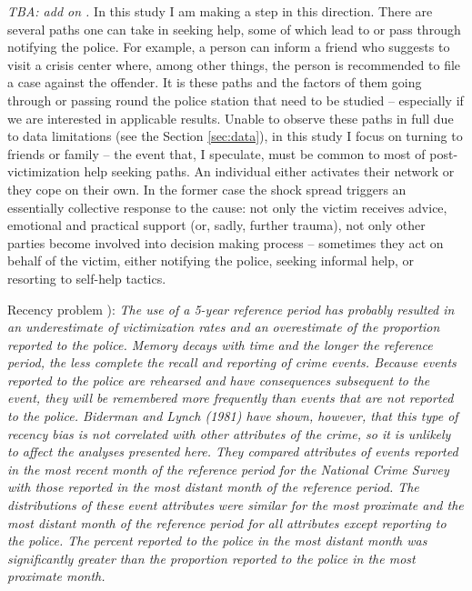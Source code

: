 \documentclass[]{article}
\begin{document}
 	
 \textit{TBA: add on \cite{pescosolido1998social}.} In this study I am making a step in this direction. There are several paths one can take in seeking help, some of which lead to or pass through notifying the police. For example, a person can inform a friend who suggests to visit a crisis center where, among other things, the person is recommended to file a case against the offender. It is these paths and the factors of them going through or passing round the police station that need to be studied -- especially if we are interested in applicable results. Unable to observe these paths in full due to data limitations (see the Section \ref{sec:data}), in this study I focus on turning to friends or family -- the event that, I speculate, must be common to most of post-victimization help seeking paths. An individual either activates their network or they cope on their own. In the former case the shock spread triggers an essentially collective response to the cause: not only the victim receives advice, emotional and practical support (or, sadly, further trauma), not only other parties become involved into decision making process -- sometimes they act on behalf of the victim, either notifying the police, seeking informal help, or resorting to self-help tactics.

		Recency problem \citep{goudriaan2004reporting}):
\textit{The use of a 5-year reference period has probably resulted in an underestimate of victimization rates and an overestimate of the proportion reported to the police. Memory decays with time and the longer the reference period, the less complete the recall and reporting of crime events. Because events reported to the police are rehearsed and have consequences subsequent to the event, they will be remembered more frequently than events that are not reported to the police. Biderman and Lynch (1981) have shown, however, that this type of recency bias is not correlated with other attributes of the crime, so it is unlikely to affect the analyses presented here. They compared attributes of events reported in the most recent month of the reference period for the National Crime Survey with those reported in the most distant month of the reference period. The distributions of these event attributes were similar for the most proximate and the most distant month of the reference period for all attributes except reporting to the police. The percent reported to the police in the most distant month was significantly greater than the proportion reported to the police in the most proximate month.}
\end{document}
